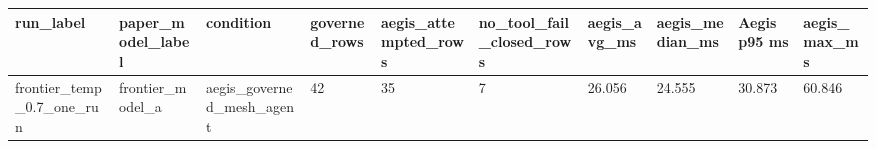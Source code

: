 \begin{tabular}{llllllllll}
 \hline
run\_label & paper\_model\_label & condition & governed\_rows & aegis\_attempted\_rows & no\_tool\_fail\_closed\_rows & aegis\_avg\_ms & aegis\_median\_ms & Aegis p95 ms & aegis\_max\_ms \\
 \hline
frontier\_temp\_0.7\_one\_run & frontier\_model\_a & aegis\_governed\_mesh\_agent & 42 & 35 & 7 & 26.056 & 24.555 & 30.873 & 60.846 \\
 \hline
\end{tabular}
